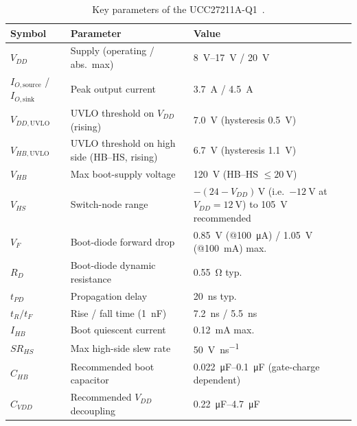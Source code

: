 \documentclass[journal,onecolumn,11pt]{IEEEtran}
\begin{document}
\begin{table}[!t]
\centering
\caption{Key parameters of the UCC27211A-Q1~\cite{ucc27211}.}
\label{tab:gd}
\renewcommand{\arraystretch}{1.2}
\begin{tabularx}{\textwidth}{@{}l L L@{}}
\toprule
\textbf{Symbol} & \textbf{Parameter} & \textbf{Value} \\
\midrule
$V_{DD}$ & Supply (operating / abs.\ max) & \SIrange{8}{17}{\volt} / \SI{20}{\volt} \\
$I_{O,\mathrm{source}}$ / $I_{O,\mathrm{sink}}$ & Peak output current & \SI{3.7}{\ampere} / \SI{4.5}{\ampere} \\
$V_{DD,\mathrm{UVLO}}$ & UVLO threshold on $V_{DD}$ (rising) & \SI{7.0}{\volt} (hysteresis \SI{0.5}{\volt}) \\
$V_{HB,\mathrm{UVLO}}$ & UVLO threshold on high side (HB--HS, rising) & \SI{6.7}{\volt} (hysteresis \SI{1.1}{\volt}) \\
$V_{HB}$ & Max boot-supply voltage & \SI{120}{\volt} (HB--HS $\le\SI{20}{\volt}$) \\
$V_{HS}$ & Switch-node range & $-(24-V_{DD})\,$V (i.e.\ $-\SI{12}{\volt}$ at $V_{DD}=\SI{12}{\volt}$) to \SI{105}{\volt} recommended \\
$V_{F}$ & Boot-diode forward drop & \SI{0.85}{\volt} (@\SI{100}{\micro\ampere}) / \SI{1.05}{\volt} (@\SI{100}{\milli\ampere}) max. \\
$R_{D}$ & Boot-diode dynamic resistance & \SI{0.55}{\ohm} typ. \\
$t_{PD}$ & Propagation delay & \SI{20}{\nano\second} typ. \\
$t_{R}/t_{F}$ & Rise / fall time (\SI{1}{\nano\farad}) & \SI{7.2}{\nano\second} / \SI{5.5}{\nano\second} \\
$I_{HB}$ & Boot quiescent current & \SI{0.12}{\milli\ampere} max. \\
$SR_{HS}$ & Max high-side slew rate & \SI{50}{\volt\per\nano\second} \\
$C_{HB}$ & Recommended boot capacitor & \SIrange{0.022}{0.1}{\micro\farad} (gate-charge dependent) \\
$C_{VDD}$ & Recommended $V_{DD}$ decoupling & \SIrange{0.22}{4.7}{\micro\farad} \\
\bottomrule
\end{tabularx}
\end{table}
\end{document}
